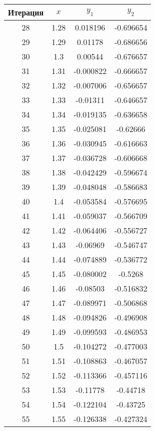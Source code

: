\begin{center}
\begin{tabular}{|c|c|c|c|}
	\end{tabular}
\begin{tabular}{|c|c|c|c|}
		\hline
		Итерация & $ x $ & $ y_{1} $ & $ y_{2} $\\
		\hline
		28 & 1.28 & 0.018196 & -0.696654 \\
		\hline
		29 & 1.29 & 0.01178 & -0.686656 \\
		\hline
		30 & 1.3 & 0.00544 & -0.676657 \\
		\hline
		31 & 1.31 & -0.000822 & -0.666657 \\
		\hline
		32 & 1.32 & -0.007006 & -0.656657 \\
		\hline
		33 & 1.33 & -0.01311 & -0.646657 \\
		\hline
		34 & 1.34 & -0.019135 & -0.636658 \\
		\hline
		35 & 1.35 & -0.025081 & -0.62666 \\
		\hline
		36 & 1.36 & -0.030945 & -0.616663 \\
		\hline
		37 & 1.37 & -0.036728 & -0.606668 \\
		\hline
		38 & 1.38 & -0.042429 & -0.596674 \\
		\hline
		39 & 1.39 & -0.048048 & -0.586683 \\
		\hline
		40 & 1.4 & -0.053584 & -0.576695 \\
		\hline
		41 & 1.41 & -0.059037 & -0.566709 \\
		\hline
		42 & 1.42 & -0.064406 & -0.556727 \\
		\hline
		43 & 1.43 & -0.06969 & -0.546747 \\
		\hline
		44 & 1.44 & -0.074889 & -0.536772 \\
		\hline
		45 & 1.45 & -0.080002 & -0.5268 \\
		\hline
		46 & 1.46 & -0.08503 & -0.516832 \\
		\hline
		47 & 1.47 & -0.089971 & -0.506868 \\
		\hline
		48 & 1.48 & -0.094826 & -0.496908 \\
		\hline
		49 & 1.49 & -0.099593 & -0.486953 \\
		\hline
		50 & 1.5 & -0.104272 & -0.477003 \\
		\hline
		51 & 1.51 & -0.108863 & -0.467057 \\
		\hline
		52 & 1.52 & -0.113366 & -0.457116 \\
		\hline
		53 & 1.53 & -0.11778 & -0.44718 \\
		\hline
		54 & 1.54 & -0.122104 & -0.43725 \\
		\hline
		55 & 1.55 & -0.126338 & -0.427324 \\

\end{tabular}
\end{center}
